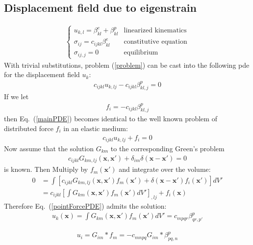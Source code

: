 \documentclass[10pt]{report}
\begin{document}
\subsection{Displacement field due to eigenstrain}
\begin{align}
\begin{cases}
u_{k,l}=\beta^e_{kl}+\beta^p_{kl}&\mbox{linearized kinematics}\\
\sigma_{ij}=c_{ijkl}\beta^e_{kl}&\mbox{constitutive equation}\\
\sigma_{ij,j}=0&\mbox{equilibrium}
\end{cases}
\label{problem}
\end{align}
With trivial substitutions, problem (\ref{problem}) can be cast into the following pde for the displacement field $u_k$:
\begin{align}
c_{ijkl}u_{k,lj}-c_{ijkl}\beta^p_{kl,j}=0
\label{mainPDE}
\end{align}
If we let 
\begin{align}
f_i=-c_{ijkl}\beta^p_{kl,j}
\end{align}
then Eq.~(\ref{mainPDE}) becomes identical to the well known problem of distributed  force $f_i$ in an elastic medium:
\begin{align}
c_{ijkl}u_{k,lj}+f_i=0
\label{pointForcePDE}
\end{align}
Now assume that the solution $G_{km}$ to the corresponding Green's problem 
\begin{align}
c_{ijkl}G_{km,lj}(\bm x,\bm x')+\delta_{im}\delta(\bm x-\bm x')=0
\label{greenFunctionElasticity}
\end{align}
is known. Then Multiply by $f_m(\bm x')$ and integrate over the volume:
\begin{align}
0&=\int \left[c_{ijkl}G_{km,lj}(\bm x,\bm x')f_m(\bm x')+\delta(\bm x-\bm x')f_i(\bm x')\right]dV'\nonumber\\
&=c_{ijkl}\left[\int G_{km}(\bm x,\bm x')f_m(\bm x')dV'\right]_{,lj}+f_i(\bm x)
\end{align}
 Therefore Eq.~(\ref{pointForcePDE}) admits the solution:
\begin{align}
u_{k}(\bm x)=\int G_{km}(\bm x,\bm x')f_m(\bm x')dV'=c_{mpqr}\beta^p_{qr,p'}
\end{align}

\begin{align}
u_{i}= G_{im} * f_m=-c_{mnpq}G_{im} * \beta^p_{pq,n}
\end{align}


\end{document}
